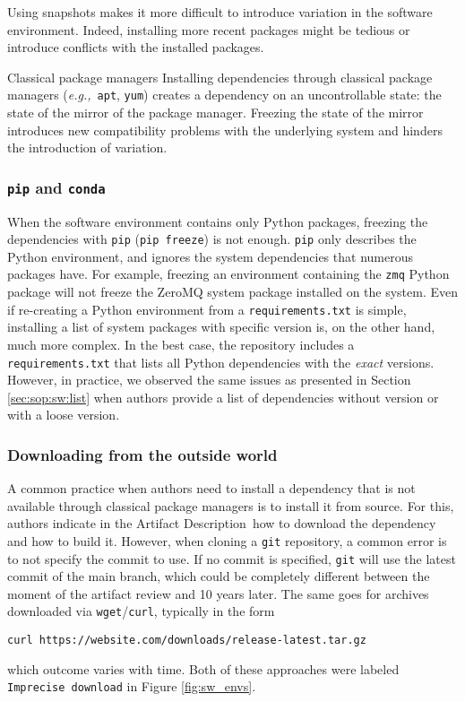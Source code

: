 \documentclass[sigconf,natbib=false]{acmart}
\newcommand{\eg}{\emph{e.g.,}}
\newcommand{\ad}{Artifact Description}
\begin{document}
Using snapshots makes it more difficult to introduce variation in the software environment.
Indeed, installing more recent packages might be tedious or introduce conflicts with the installed packages.


\begin{lesson}{Classical package managers}{}
  Installing dependencies through classical package managers (\eg\ \texttt{apt}, \texttt{yum}) creates a dependency on an uncontrollable state: the state of the mirror of the package manager.
  Freezing the state of the mirror introduces new compatibility problems with the underlying system and hinders the introduction of variation.
\end{lesson}

\subsubsection{\texttt{pip} and \texttt{conda}}

When the software environment contains only Python packages, freezing the dependencies with \texttt{pip} (\texttt{pip freeze}) is not enough.
\texttt{pip} only describes the Python environment, and ignores the system dependencies that numerous packages have. 
For example, freezing an environment containing the \texttt{zmq} Python package will not freeze the ZeroMQ system package installed on the system.  
Even if re-creating a Python environment from a \texttt{requirements.txt} is simple, installing a list of system packages with specific version is, on the other hand, much more complex.
In the best case, the repository includes a \texttt{requirements.txt} that lists all Python dependencies with the \emph{exact} versions.
However, in practice, we observed the same issues as presented in Section \ref{sec:sop:sw:list} when authors provide a list of dependencies without version or with a loose version.

\subsubsection{Downloading from the outside world}

A common practice when authors need to install a dependency that is not available through classical package managers is to install it from source.
For this, authors indicate in the \ad\ how to download the dependency and how to build it.
However, when cloning a \texttt{git} repository, a common error is to not specify the commit to use.
If no commit is specified, \texttt{git} will use the latest commit of the main branch, which could be completely different between the moment of the artifact review and 10 years later.
The same goes for archives downloaded via \texttt{wget}/\texttt{curl}, typically in the form
\begin{verbatim}
curl https://website.com/downloads/release-latest.tar.gz
\end{verbatim}
which outcome varies with time.
Both of these approaches were labeled \texttt{Imprecise download} in Figure \ref{fig:sw_envs}.
\end{document}
